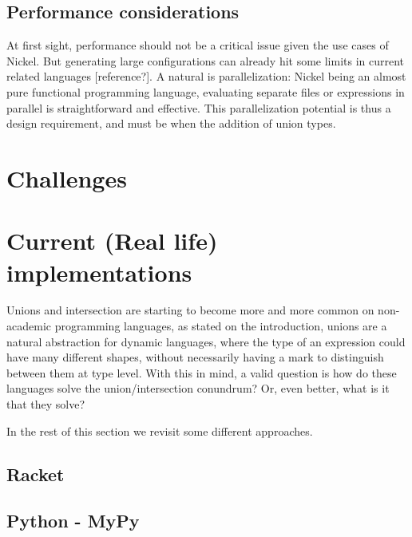 \documentclass[sigplan,10pt,review,anonymous]{acmart}
\newcommand{\unsure}[2][1=]{}
\newcommand{\info}[2][1=]{}
\begin{document}
\unsure{Something that we must mention somewhere: if we want to check
  that something is a list of As lazily (to avoid making functions
  like hd be O(n), for instance), then we have a lot of the problems of
  higher-order contracts anyway.}

\subsection{Performance considerations}
\info{This a draft}

At first sight, performance should not be a critical issue given the use cases
of Nickel. But generating large configurations can already hit some limits in
current related languages [reference?]. A natural is parallelization:
Nickel being an almost pure functional programming language, evaluating separate
files or expressions in parallel is straightforward and effective. This
parallelization potential is thus a design requirement, and must be when the
addition of union types.

\section{Challenges}


\section{Current (Real life) implementations}

\info{The goal of this section is to outline existing languages that implement
union and intersection, in some form, and shortly compare these
with the semantics tried to obtain on research (WMW, KT)}

Unions and intersection are starting to become more and more common
on non-academic programming languages, as stated on the introduction,
unions are a natural abstraction for dynamic languages, where the type
of an expression could have many different shapes, without necessarily
having a mark to distinguish between them at type level.
With this in mind, a valid question is how do these languages solve the
union/intersection conundrum? Or, even better, what is it that they
solve?

In the rest of this section we revisit some different approaches.

\subsection{Racket}


\subsection{Python - MyPy}

\unsure{We ought to group all the static typing in one subsection}
\end{document}
